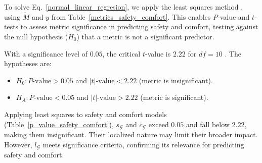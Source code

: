 \documentclass[lettersize,journal]{IEEEtran}
\begin{document}



To solve Eq.~\eqref{normal_linear_regresion}, we apply the least squares method \cite{bjorck1990least}, using $\tilde{M}$ and $y$ from Table~\ref{metrics_safety_comfort}. This enables $P$-value and $t$-tests to assess metric significance in predicting safety and comfort, testing against the null hypothesis ($H_0$) that a metric is not a significant predictor.

With a significance level of $0.05$, the critical $t$-value is $2.22$ for $df = 10$ \cite{frost2024tdistribution}. The hypotheses are:

\begin{itemize}
\item $H_{0}: P\text{-value} > 0.05$ and $|t|\text{-value} < 2.22$ (metric is insignificant).
\item $H_{A}: P\text{-value} < 0.05$ and $|t|\text{-value} > 2.22$ (metric is significant).
\end{itemize}

Applying least squares to safety and comfort models (Table~\ref{p_value_safety_comfort}), $s_{\mathcal{G}}$ and $c_{\mathcal{G}}$ exceed $0.05$ and fall below $2.22$, making them insignificant. Their localized nature may limit their broader impact. However, $l_{\mathcal{G}}$ meets significance criteria, confirming its relevance for predicting safety and comfort.
\end{document}
